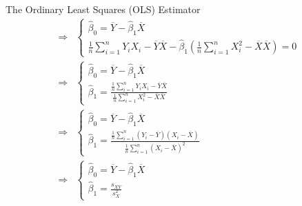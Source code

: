 \documentclass[notes,10pt, aspectratio=169]{beamer}
\begin{document}
\begin{frame}{The Ordinary Least Squares (OLS) Estimator}
\begin{eqnarray*}
        \Rightarrow
    &\begin{cases}
    \hat{\beta}_0 = \overline{Y}  -\hat{\beta}_1 \overline{X}\\
    \frac{1}{n}\sum_{i=1}^n Y_iX_i - \overline{Y}\overline{X} - \hat{\beta}_1( \frac{1}{n}\sum_{i=1}^n X_i^2 - \overline{X}\overline{X}) = 0
    \end{cases}\\ 
    \Rightarrow
    &\begin{cases}
    \hat{\beta}_0 = \overline{Y}  -\hat{\beta}_1 \overline{X}\\
    \hat{\beta}_1= \frac{\frac{1}{n}\sum_{i=1}^n Y_iX_i - \overline{Y}\overline{X}}{\frac{1}{n}\sum_{i=1}^n X_i^2 - \overline{X}\overline{X}}
    \end{cases}\\ 
        \Rightarrow
    &\begin{cases}
    \hat{\beta}_0 = \overline{Y}  -\hat{\beta}_1 \overline{X}\\
    \hat{\beta}_1= \frac{\frac{1}{n}\sum_{i=1}^n (Y_i-\overline{Y})(X_i - \overline{X})}{\frac{1}{n}\sum_{i=1}^n (X_i - \overline{X})^2}
    \end{cases}\\ 
     \Rightarrow
    &\begin{cases}
    \hat{\beta}_0 = \overline{Y}  -\hat{\beta}_1 \overline{X}\\
    \hat{\beta}_1= \frac{s_{XY}}{s^2_{X}}
    \end{cases}\\
\end{eqnarray*}

\end{frame}
\end{document}
